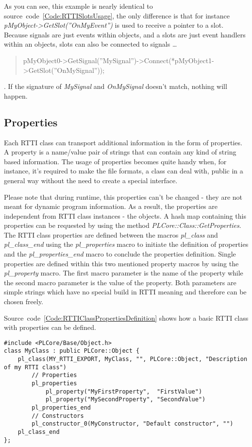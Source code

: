 As you can see, this example is nearly identical to source~code~\ref{Code:RTTISlotsUsage}, the only difference is that for instance \emph{pMyObject->GetSlot(''OnMyEvent'')} is used to receive a pointer to a slot. Because signals are just events within objects, and a slots are just event handlers within an objects, slots can also be connected to signals \ldots \begin{quote}pMyObject0->GetSignal(''MySignal'')->Connect(*pMyObject1->GetSlot(''OnMySignal''));\end{quote}. If the signature of \emph{MySignal} and \emph{OnMySignal} doesn't match, nothing will happen.



\subsection{Properties}
Each RTTI class can transport additional information in the form of properties. A property is a name/value pair of strings that can contain any kind of string based information. The usage of properties becomes quite handy when, for instance, it's required to make the file formats, a class can deal with, public in a general way without the need to create a  special interface.

Please note that during runtime, this properties can't be changed - they are not meant for dynamic program information. As a result, the properties are independent from RTTI class instances - the objects. A hash map containing this properties can be requested by using the method \emph{PLCore::Class::GetProperties}. The RTTI class properties are defined between the macros \emph{pl\_class} and \emph{pl\_class\_end} using the \emph{pl\_properties} macro to initiate the definition of properties and the \emph{pl\_properties\_end} macro to conclude the properties definition. Single properties are defined within this two mentioned property macros by using the \emph{pl\_property} macro. The first macro parameter is the name of the property while the second macro parameter is the value of the property. Both parameters are simple strings which have no special build in RTTI meaning and therefore can be chosen freely.

Source~code~\ref{Code:RTTIClassPropertiesDefinition} shows how a basic RTTI class with properties can be defined.
\begin{lstlisting}[float=htb,label=Code:RTTIClassPropertiesDefinition,caption={Defining a new RTTI class with properties}]
#include <PLCore/Base/Object.h>
class MyClass : public PLCore::Object {
	pl_class(MY_RTTI_EXPORT, MyClass, "", PLCore::Object, "Description of my RTTI class")
		// Properties
		pl_properties
			pl_property("MyFirstProperty",  "FirstValue")
			pl_property("MySecondProperty", "SecondValue")
		pl_properties_end
		// Constructors
		pl_constructor_0(MyConstructor, "Default constructor", "")
	pl_class_end
};
\end{lstlisting}

